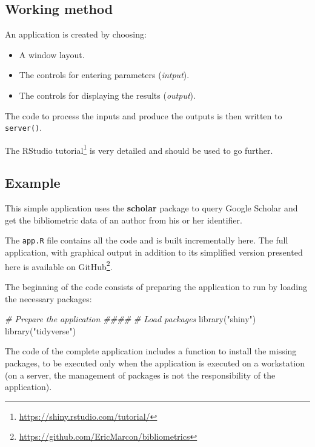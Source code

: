 \documentclass[
  12pt,
  american,
  a4paper,
  extrafontsizes,onecolumn,openright
  ]{memoir}
\newenvironment{Shaded}{\begin{snugshade}}{\end{snugshade}}
\newcommand{\CommentTok}[1]{\textcolor[rgb]{0.56,0.35,0.01}{\textit{#1}}}
\newcommand{\FunctionTok}[1]{\textcolor[rgb]{0.00,0.00,0.00}{#1}}
\newcommand{\NormalTok}[1]{#1}
\newcommand{\StringTok}[1]{\textcolor[rgb]{0.31,0.60,0.02}{#1}}
\providecommand{\tightlist}{%
  \setlength{\itemsep}{0pt}\setlength{\parskip}{0pt}}
\begin{document}
\hypertarget{working-method}{%
\subsection{Working method}\label{working-method}}

An application is created by choosing:

\begin{itemize}
\tightlist
\item
  A window layout.
\item
  The controls for entering parameters (\emph{intput}).
\item
  The controls for displaying the results (\emph{output}).
\end{itemize}

The code to process the inputs and produce the outputs is then written to \texttt{server()}.

The RStudio tutorial\footnote{\url{https://shiny.rstudio.com/tutorial/}} is very detailed and should be used to go further.

\hypertarget{example}{%
\subsection{Example}\label{example}}

This simple application uses the \textbf{scholar} package to query Google Scholar and get the bibliometric data of an author from his or her identifier.

The \texttt{app.R} file contains all the code and is built incrementally here.
The full application, with graphical output in addition to its simplified version presented here is available on GitHub\footnote{\url{https://github.com/EricMarcon/bibliometrics}}.

The beginning of the code consists of preparing the application to run by loading the necessary packages:

\scriptsize

\begin{Shaded}
\begin{Highlighting}[]
\CommentTok{\# Prepare the application \#\#\#\#}
\CommentTok{\# Load packages}
\FunctionTok{library}\NormalTok{(}\StringTok{"shiny"}\NormalTok{)}
\FunctionTok{library}\NormalTok{(}\StringTok{"tidyverse"}\NormalTok{)}
\end{Highlighting}
\end{Shaded}

\normalsize

The code of the complete application includes a function to install the missing packages, to be executed only when the application is executed on a workstation (on a server, the management of packages is not the responsibility of the application).
\end{document}

